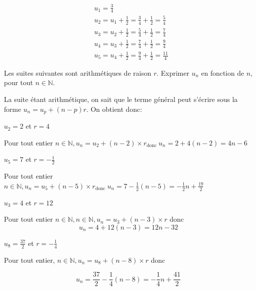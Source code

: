 \documentclass[11pt,a4paper]{article}  %
\begin{document}
\begin{enumMet}
\begin{corrBox}
		$$
		\begin{aligned}
			& u_1=\frac{3}{4} \\
			& u_2=u_1+\frac{1}{2}=\frac{3}{4}+\frac{1}{2}=\frac{5}{4} \\
			& u_3=u_2+\frac{1}{2}=\frac{5}{4}+\frac{1}{2}=\frac{7}{4} \\
			& u_4=u_3+\frac{1}{2}=\frac{7}{4}+\frac{1}{2}=\frac{9}{4} \\
			& u_5=u_4+\frac{1}{2}=\frac{9}{4}+\frac{1}{2}=\frac{11}{4}
		\end{aligned}
		$$
				
	\end{corrBox}
\end{enumMet}


Les suites suivantes sont arithmétiques de raison $r$. Exprimer $u_n$ en fonction de $n$, pour tout $n \in \mathbb{N}$.
\begin{corrBox}
	La suite étant arithmétique, on sait que le terme général peut s'écrire sous la forme $u_n=u_p+(n-p) r$. On obtient donc:	
\end{corrBox}
	\begin{enumMet}
	\item $u_2=2$ et $r=4$
	\begin{corrBox}
		Pour tout entier $n \in \mathbb{N}, u_n=u_2+(n-2) \times r_{\text {donc }} u_n=2+4(n-2)=4 n-6$
	\end{corrBox}
	\item $u_5=7$ et $r=-\frac{1}{2}$
	\begin{corrBox}
		Pour tout entier $n \in \mathbb{N}, u_n=u_5+(n-5) \times r_{\text {donc }} u_n=7-\frac{1}{2}(n-5)=-\frac{1}{2} n+\frac{19}{2}$	
	\end{corrBox}
	\item $u_3=4$ et $r=12$
	\begin{corrBox}
		Pour tout entier $n \in \mathbb{N}, n \in \mathbb{N}, u_n=u_3+(n-3) \times r$ donc
		$$
		u_n=4+12(n-3)=12 n-32
		$$	
	\end{corrBox}
	\item $u_8=\frac{37}{2}$ et $r=-\frac{1}{4}$
	\begin{corrBox}
		Pour tout entier, $n \in \mathbb{N}, u_n=u_8+(n-8) \times r$ donc
		
		$$
		u_n=\frac{37}{2}-\frac{1}{4}(n-8)=-\frac{1}{4} n+\frac{41}{2}
		$$				
	\end{corrBox}
\end{enumMet}
\end{document}
